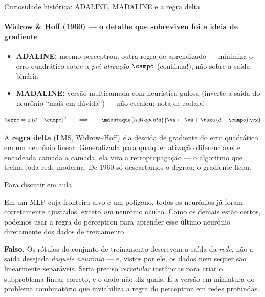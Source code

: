 \documentclass[aspectratio=169, 11pt]{beamer}
\begin{document}
\begin{frame}{Curiosidade histórica: ADALINE, MADALINE e a regra delta}
  \framesubtitle{Widrow \& Hoff (1960) — o detalhe que sobreviveu foi a ideia de gradiente}

  \begin{itemize}\setlength{\itemsep}{0.3ex}
    \item \textbf{ADALINE:} mesmo perceptron, outra regra de aprendizado —
          minimiza o erro quadrático sobre a \emph{pré-ativação} $\campo$
          (contínua!), não sobre a saída binária
    \item \textbf{MADALINE:} versão multicamada com heurística gulosa (inverte
          a saída do neurônio ``mais em dúvida'') — não escalou; nota de rodapé
  \end{itemize}

  \[
    \erro = \tfrac{1}{2}\,(d - \campo)^2
    \qquad\Longrightarrow\qquad
    \mdestaque{icMagenta}{\vw \leftarrow \vw + \taxa\,(d - \campo)\,\vx}
  \]

  \begin{ideiabox}
    A \textbf{regra delta} (LMS, Widrow--Hoff) \emph{é} a descida de gradiente
    do erro quadrático em um neurônio linear. Generalizada para qualquer
    ativação diferenciável e encadeada camada a camada, ela vira a
    \alert{retropropagação} — o algoritmo que treina toda rede moderna. De
    1960 só descartamos o degrau; o gradiente ficou.
  \end{ideiabox}
\end{frame}

\begin{frame}{Para discutir em aula}
  \begin{quizbox}
    Em um MLP cuja fronteira-alvo é um polígono, todos os neurônios já foram
    corretamente ajustados, exceto \emph{um} neurônio oculto. Como os demais
    estão certos, podemos usar a regra do perceptron para aprender esse último
    neurônio diretamente dos dados de treinamento.

    \smallskip
  \end{quizbox}

  \pause

  \begin{respbox}
    \textbf{Falso.} Os rótulos do conjunto de treinamento descrevem a saída da
    \emph{rede}, não a saída desejada \emph{daquele neurônio} — e, vistos por
    ele, os dados nem sequer são linearmente separáveis. Seria preciso
    \emph{rerrotular} instâncias para criar o subproblema linear correto, e o
    dado não diz quais. É a versão em miniatura do problema combinatório que
    inviabiliza a regra do perceptron em redes profundas.
  \end{respbox}
\end{frame}
\end{document}

